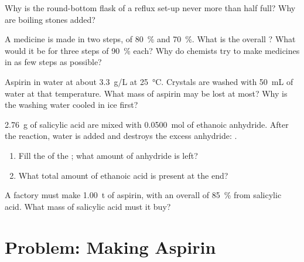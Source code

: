 \begin{exercise}[$\star\star$]\label{exo:g10:synthesis-yield:11}
Why is the round-bottom flask of a reflux set-up never more than half
full? Why are boiling stones added?
\end{exercise}

\begin{exercise}[$\star\star\star$]\label{exo:g10:synthesis-yield:12}
A medicine is made in two steps, of  \qty{80}{\percent} and
\qty{70}{\percent}. What is the overall ? What would it be for
three steps of \qty{90}{\percent} each? Why do chemists try to make
medicines in as few steps as possible?
\end{exercise}

\begin{exercise}[$\star\star\star$]\label{exo:g10:synthesis-yield:13}
Aspirin  in water at about \qty{3.3}{g/L} at
\qty{25}{\celsius}. Crystals are washed with \qty{50}{mL} of water at
that temperature. What mass of aspirin may be lost at most? Why is the
washing water cooled in ice first?
\end{exercise}

\begin{exercise}[$\star\star\star$]\label{exo:g10:synthesis-yield:14}
\qty{2.76}{g} of salicylic acid are mixed with \qty{0.0500}{mol} of
ethanoic anhydride. After the reaction, water is added and destroys the
excess anhydride: .
\begin{enumerate}
  \item Fill the  of the ; what amount of
        anhydride is left?
  \item What total amount of ethanoic acid is present at the end?
\end{enumerate}
\end{exercise}

\begin{exercise}[$\star\star\star$]\label{exo:g10:synthesis-yield:15}
A factory must make \qty{1.00}{t} of aspirin, with an overall  of
\qty{85}{\percent} from salicylic acid. What mass of salicylic acid must
it buy?
\end{exercise}

\section{Problem: Making Aspirin}

